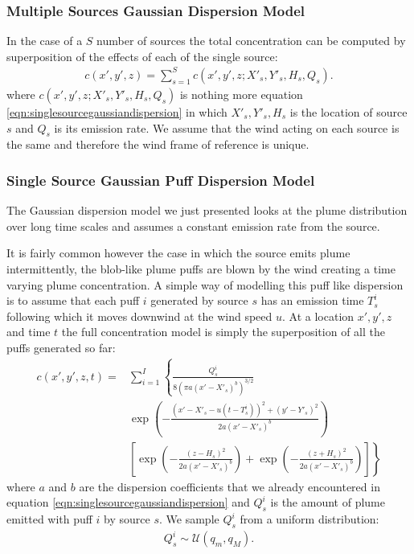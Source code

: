 \documentclass[a4paper,11pt]{report}
\begin{document}
\subsubsection{Multiple Sources Gaussian Dispersion Model}

In the case of a $S$ number of sources the total concentration can be computed by superposition of the effects of each of the single source:
\begin{align}\label{eqn:multiplesourcesgaussiandispersion}
c(x',y',z) = \sum_{s=1}^S c(x',y',z;X'_s,Y'_s,H_s,Q_s).
\end{align}
where $c(x',y',z;X'_s,Y'_s,H_s,Q_s)$ is nothing more equation \ref{eqn:singlesourcegaussiandispersion} in which $X'_s,Y'_s,H_s$ is the location of source $s$ and $Q_s$ is its emission rate.
We assume that the wind acting on each source is the same and therefore the wind frame of reference is unique.

\subsubsection{Single Source Gaussian Puff Dispersion Model}

The Gaussian dispersion model we just presented looks at the plume distribution over long time scales and assumes a constant emission rate from the source. 

It is fairly common however the case in which the source emits plume intermittently, the blob-like plume puffs are blown by the wind creating a time varying plume concentration.
A simple way of modelling this puff like dispersion is to assume that each puff $i$ generated by source $s$ has an emission time $T^i_s$ following which it moves downwind at the wind speed $u$. At a location $x',y',z$ and time $t$ the full concentration model is simply the superposition of all the puffs generated so far:
\begin{align}\label{eqn:singlesourcesgaussianpuffdispersion}
c(x',y',z,t) = & \sum_{i=1}^I \left\{ \frac{Q^i_s}{8(\pi a (x'-X'_s)^b)^{3/2}} \right. \nonumber \\
& \exp\left(-\frac{(x'-X'_s-u(t-T^i_s))^2+(y'-Y'_s)^2}{2 a (x'-X'_s)^b}\right) \nonumber \\
& \left. \left[\exp\left(-\frac{(z-H_s)^2}{2 a (x'-X'_s)^b}\right) + \exp\left(-\frac{(z+H_s)^2}{2 a (x'-X'_s)^b}\right)\right]\right\}
\end{align}
where $a$ and $b$ are the dispersion coefficients that we already encountered in equation \ref{eqn:singlesourcegaussiandispersion} and $Q^i_s$ is the amount of plume emitted with puff $i$ by source $s$. We sample $Q^i_s$ from a uniform distribution:
\begin{align}\label{eqn:qi}
Q^i_s \sim \mathcal{U}(q_m,q_M).
\end{align}
\end{document}
